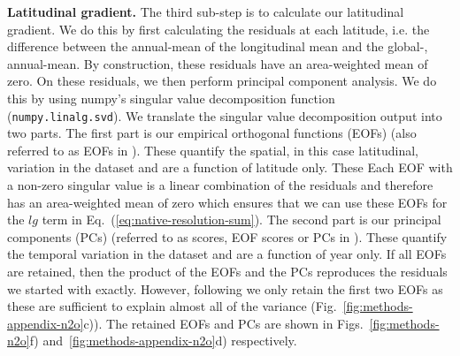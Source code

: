 \textbf{Latitudinal gradient.}
The third sub-step is to calculate our latitudinal gradient.
We do this by first calculating the residuals at each latitude,
i.e. the difference between the annual-mean of the longitudinal mean and the global-, annual-mean.
By construction, these residuals have an area-weighted mean of zero.
On these residuals, we then perform principal component analysis.
We do this by using numpy's \citep{harris_numpy_2020} singular value decomposition function (\texttt{numpy.linalg.svd}).
We translate the singular value decomposition output into two parts.
The first part is our empirical orthogonal functions (EOFs) (also referred to as EOFs in \citealp{meinshausen_historical-ghgs_2017}).
These quantify the spatial, in this case latitudinal, variation in the dataset and are a function of latitude only.
These
Each EOF with a non-zero singular value
is a linear combination of the residuals
and therefore has an area-weighted mean of zero
which ensures that we can use these EOFs for the $lg$ term in Eq.~(\ref{eq:native-resolution-sum}).
The second part is our principal components (PCs) (referred to as scores, EOF scores or PCs in \citealp{meinshausen_historical-ghgs_2017}).
These quantify the temporal variation in the dataset and are a function of year only.
If all EOFs are retained, then the product of the EOFs and the PCs
reproduces the residuals we started with exactly.
However, following \citet{meinshausen_historical-ghgs_2017}
we only retain the first two EOFs as these are sufficient
to explain almost all of the variance (Fig.~\ref{fig:methods-appendix-n2o}c)).
The retained EOFs and PCs are shown in Figs.~\ref{fig:methods-n2o}f) and~\ref{fig:methods-appendix-n2o}d) respectively.

